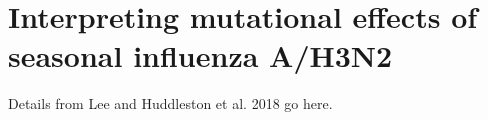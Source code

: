 \chapter{Interpreting mutational effects of seasonal influenza A/H3N2}

Details from Lee and Huddleston et al. 2018 go here.
